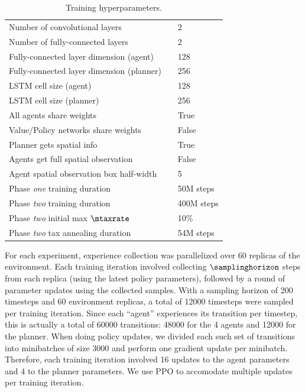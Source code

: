 \begin{table}[ht!]
\begin{small}
\begin{center}
\begin{tabular}[c]{lll}
                Number of convolutional layers & & 2 \\
                Number of fully-connected layers & & 2 \\
                Fully-connected layer dimension (agent) & & 128 \\
                Fully-connected layer dimension (planner) & & 256 \\
                LSTM cell size (agent) & & 128 \\
                LSTM cell size (planner) & & 256 \\
                All agents share weights & & True \\
                Value/Policy networks share weights & & False \\

                \hline

                Planner gets spatial info & & True \\
                Agents get full spatial observation & & False \\
                Agent spatial observation box half-width & & 5 \\

                \hline

                Phase \textit{one} training duration & & 50M steps \\
                Phase \textit{two} training duration & & 400M steps \\
                Phase \textit{two} initial max $\mtaxrate$ & & 10\% \\
                Phase \textit{two} tax annealing duration & & 54M steps \\


            \end{tabular}
        \end{center}
        \caption{Training hyperparameters.}
        \label{tab:training_settings_ai}
    \end{small}
\end{table}
For each experiment, experience collection was parallelized over 60 replicas of the environment.
Each training iteration involved collecting $\samplinghorizon$ steps from each replica (using the latest policy parameters), followed by a round of parameter updates using the collected samples.
With a sampling horizon of 200 timesteps and 60 environment replicas, a total of 12000 timesteps were sampled per training iteration.
Since each ``agent'' experiences its transition per timestep, this is actually a total of 60000 transitions: 48000 for the 4 agents and 12000 for the planner.
When doing policy updates, we divided each such set of transitions into minibatches of size 3000 and perform one gradient update per minibatch.
Therefore, each training iteration involved 16 updates to the agent parameters and 4 to the planner parameters.
We use PPO to accomodate multiple updates per training iteration.

